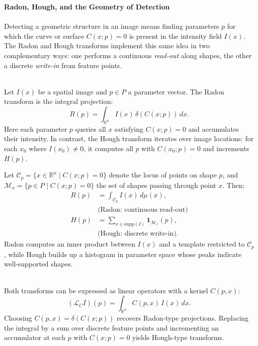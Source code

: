 \begin{technical}
{\Large\textbf{Radon, Hough, and the Geometry of Detection}}\\[0.3em]


\\[0.5em]
Detecting a geometric structure in an image means finding parameters $p$ for which the curve or surface $C(x;p)=0$ is present in the intensity field $I(x)$. The Radon and Hough transforms implement this same idea in two complementary ways: one performs a continuous \emph{read-out} along shapes, the other a discrete \emph{write-in} from feature points.


\\[0.5em]
Let $I(x)$ be a spatial image and $p \in P$ a parameter vector. The Radon transform is the integral projection:
\[
R(p) = \int_{\mathbb{R}^n} I(x)\, \delta(C(x; p))\, dx.
\]
Here each parameter $p$ queries all $x$ satisfying $C(x;p)=0$ and accumulates their intensity. In contrast, the Hough transform iterates over image locations: for each $x_0$ where $I(x_0)\neq 0$, it computes all $p$ with $C(x_0;p)=0$ and increments $H(p)$.


Let $\mathcal{C}_p = \{x \in \mathbb{R}^n \mid C(x; p) = 0\}$ denote the locus of points on shape $p$, and $\mathcal{M}_x = \{p \in P \mid C(x; p) = 0\}$ the set of shapes passing through point $x$. Then:
\begin{align*}
R(p) &= \int_{\mathcal{C}_p} I(x)\, d\mu(x),\\
&\text{(Radon: continuous read-out)}\\
H(p) &= \sum_{x \in \mathrm{supp}(I)} \mathbf{1}_{\mathcal{M}_x}(p),\\
&\text{(Hough: discrete write-in).}
\end{align*}
Radon computes an inner product between $I(x)$ and a template restricted to $\mathcal{C}_p$, while Hough builds up a histogram in parameter space whose peaks indicate well-supported shapes.


\\[0.5em]
Both transforms can be expressed as linear operators with a kernel $C(p,x)$:
\[
(\mathcal{L}_C I)(p) = \int_{\mathbb{R}^n} C(p,x)\, I(x)\, dx.
\]
Choosing $C(p,x)=\delta(C(x; p))$ recovers Radon-type projections. Replacing the integral by a sum over discrete feature points and incrementing an accumulator at each $p$ with $C(x; p)=0$ yields Hough-type transforms.



\end{technical}
